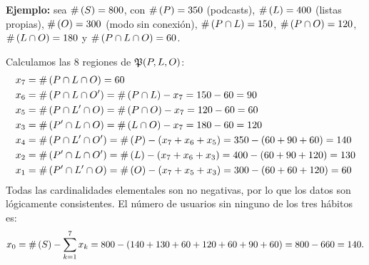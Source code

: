 \begin{solproblema}[prob:95d5458]
	\textbf{Ejemplo:} sea $\#\left( S \right)=800$, con $\#\left( P \right)=350$ (podcasts), $\#\left( L \right)=400$ (listas propias), $\#\left( O \right)=300$ (modo sin conexión), $\#\left( P \cap L \right)=150$, $\#\left( P \cap O \right)=120$, $\#\left( L \cap O \right)=180$ y $\#\left( P \cap L \cap O \right)=60$.

	Calculamos las 8 regiones de $\mathfrak{P}(P,L,O)$:
	\begin{align}
		x_7 &= \#\left( P \cap L \cap O \right) = 60 \\
		x_6 &= \#\left( P \cap L \cap O' \right) = \#\left( P \cap L \right) - x_7 = 150-60 = 90 \\
		x_5 &= \#\left( P \cap L' \cap O \right) = \#\left( P \cap O \right) - x_7 = 120-60 = 60 \\
		x_3 &= \#\left( P' \cap L \cap O \right) = \#\left( L \cap O \right) - x_7 = 180-60 = 120 \\
		x_4 &= \#\left( P \cap L' \cap O' \right) = \#\left( P \right) - (x_7+x_6+x_5) = 350-(60+90+60) = 140 \\
		x_2 &= \#\left( P' \cap L \cap O' \right) = \#\left( L \right) - (x_7+x_6+x_3) = 400-(60+90+120) = 130 \\
		x_1 &= \#\left( P' \cap L' \cap O \right) = \#\left( O \right) - (x_7+x_5+x_3) = 300-(60+60+120) = 60
	\end{align}
	Todas las cardinalidades elementales son no negativas, por lo que los datos son lógicamente consistentes. El número de usuarios sin ninguno de los tres hábitos es:
	\begin{align}
		x_0 = \#\left( S \right) - \sum_{k=1}^7 x_k = 800 - (140+130+60+120+60+90+60) = 800 - 660 = 140.
	\end{align}
\end{solproblema}

